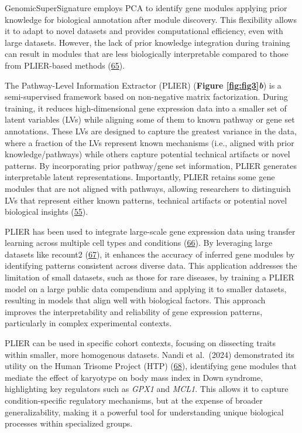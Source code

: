 GenomicSuperSignature employs PCA to identify gene modules applying prior knowledge for biological annotation after module discovery.
This flexibility allows it to adapt to novel datasets and provides computational efficiency, even with large datasets.
However, the lack of prior knowledge integration during training can result in modules that are less biologically interpretable compared to those from PLIER-based methods (\protect\hyperlink{ref-X4fhSCkz}{65}).

The Pathway-Level Information Extractor (PLIER) (\textbf{Figure \ref{fig:fig3}\emph{b}}) is a semi-supervised framework based on non-negative matrix factorization.
During training, it reduces high-dimensional gene expression data into a smaller set of latent variables (LVs) while aligning some of them to known pathway or gene set annotations.
These LVs are designed to capture the greatest variance in the data, where a fraction of the LVs represent known mechanisms (i.e., aligned with prior knowledge/pathways) while others capture potential technical artifacts or novel patterns.
By incorporating prior pathway/gene set information, PLIER generates interpretable latent representations.
Importantly, PLIER retains some gene modules that are not aligned with pathways, allowing researchers to distinguish LVs that represent either known patterns, technical artifacts or potential novel biological insights (\protect\hyperlink{ref-dg9nKuy0}{55}).

PLIER has been used to integrate large-scale gene expression data using transfer learning across multiple cell types and conditions (\protect\hyperlink{ref-14rnBunuZ}{66}).
By leveraging large datasets like recount2 (\protect\hyperlink{ref-6SPTvFXq}{67}), it enhances the accuracy of inferred gene modules by identifying patterns consistent across diverse data.
This application addresses the limitation of small datasets, such as those for rare diseases, by training a PLIER model on a large public data compendium and applying it to smaller datasets, resulting in models that align well with biological factors.
This approach improves the interpretability and reliability of gene expression patterns, particularly in complex experimental contexts.

PLIER can be used in specific cohort contexts, focusing on dissecting traits within smaller, more homogenous datasets.
Nandi et al.~(2024) demonstrated its utility on the Human Trisome Project (HTP) (\protect\hyperlink{ref-v5DtVejF}{68}), identifying gene modules that mediate the effect of karyotype on body mass index in Down syndrome, highlighting key regulators such as \emph{GPX1} and \emph{MCL1}.
This allows it to capture condition-specific regulatory mechanisms, but at the expense of broader generalizability, making it a powerful tool for understanding unique biological processes within specialized groups.


